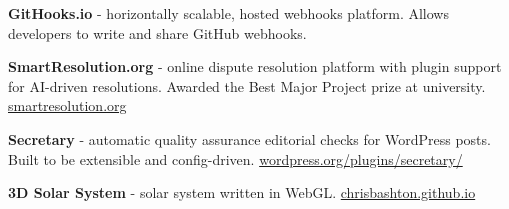 \documentclass[10pt,a4paper,ragged2e,withhyper]{altacv}
\begin{document}
\begin{paracol}{2}
\vspace{\spacer}

\textbf{GitHooks.io} - horizontally scalable, hosted webhooks platform. Allows developers to write and share GitHub webhooks.

\medskip


\vspace{\spacer}

\textbf{SmartResolution.org} - online dispute resolution platform with plugin support for AI-driven resolutions. Awarded the Best Major Project prize at university.
\newline
\href{https://smartresolution.org}{\url{smartresolution.org}}

\medskip


\medskip

\textbf{Secretary} - automatic quality assurance editorial checks for WordPress posts. Built to be extensible and config-driven.
\newline
\href{https://wordpress.org/plugins/secretary/}{\url{wordpress.org/plugins/secretary/}}

\medskip


\medskip

\textbf{3D Solar System} - solar system written in WebGL.
\newline
\href{https://chrisbashton.github.io}{\url{chrisbashton.github.io}}

\medskip


\medskip



\customreferences

\end{paracol}
\end{document}
